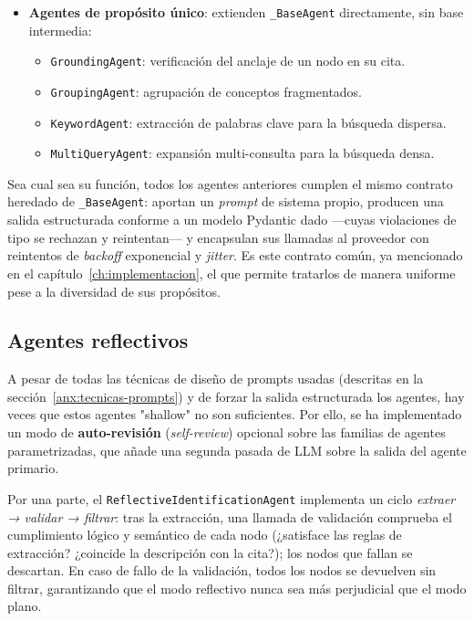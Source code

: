 \begin{itemize}
        Análogamente, \texttt{ReflectiveResolutionAgent} envuelve a cualquiera de estos agentes para
        arbitrar los ambiguos en una segunda pasada.

  \item \textbf{Agentes de propósito único}: extienden \texttt{\_BaseAgent} directamente, sin base
        intermedia:
        \begin{itemize}
          \item \texttt{GroundingAgent}: verificación del anclaje de un nodo en su cita.
          \item \texttt{GroupingAgent}: agrupación de conceptos fragmentados.
          \item \texttt{KeywordAgent}: extracción de palabras clave para la búsqueda dispersa.
          \item \texttt{MultiQueryAgent}: expansión multi-consulta para la búsqueda densa.
        \end{itemize}
\end{itemize}

Sea cual sea su función, todos los agentes anteriores cumplen el mismo contrato heredado de
\texttt{\_BaseAgent}: aportan un \textit{prompt} de sistema propio, producen una salida
estructurada conforme a un modelo Pydantic dado —cuyas violaciones de tipo se rechazan y
reintentan— y encapsulan sus llamadas al proveedor con reintentos de \textit{backoff} exponencial
y \textit{jitter}. Es este contrato común, ya mencionado en el capítulo~\ref{ch:implementacion}, el
que permite tratarlos de manera uniforme pese a la diversidad de sus propósitos.

\subsection{Agentes reflectivos}
\label{anx:agentes-reflectivos}

A pesar de todas las técnicas de diseño de prompts usadas (descritas en la sección~\ref{anx:tecnicas-prompts})
y de forzar la salida estructurada los agentes, hay veces que estos agentes "shallow" no son suficientes.
Por ello, se ha implementado un modo de \textbf{auto-revisión} (\textit{self-review}) opcional sobre las
familias de agentes parametrizadas, que añade una segunda pasada de LLM sobre la salida del agente primario.

Por una parte, el \texttt{ReflectiveIdentificationAgent} implementa un ciclo \emph{extraer → validar →
filtrar}: tras la extracción, una llamada de validación comprueba el cumplimiento lógico y semántico de
cada nodo (¿satisface las reglas de extracción? ¿coincide la descripción con la cita?); los nodos que
fallan se descartan. En caso de fallo de la validación, todos los nodos se devuelven sin filtrar,
garantizando que el modo reflectivo nunca sea más perjudicial que el modo plano.

